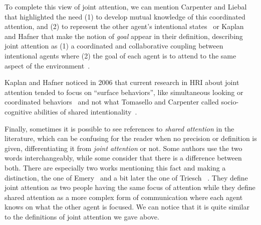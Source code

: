 \documentclass[a4paper,11pt,twoside]{StyleThese}
\begin{document}
To complete this view of joint attention, we can mention Carpenter and Liebal that highlighted the need (1) to develop mutual knowledge of this coordinated attention, and (2) to represent the other agent’s intentional states~\cite{carpenter_2011_joint} or Kaplan and Hafner that make the notion of \emph{goal} appear in their definition, describing joint attention as (1) a coordinated and collaborative coupling between intentional agents where (2) the goal of each agent is to attend to the same aspect of the environment~\cite{kaplan_2006_challenges}.

Kaplan and Hafner noticed in 2006 that current research in HRI about joint attention tended to focus on ``surface behaviors'', like simultaneous looking or coordinated behaviors~\cite{kaplan_2006_challenges} and not what Tomasello and Carpenter called socio-cognitive abilities of shared intentionality~\cite{tomasello_2007_shared}.

Finally, sometimes it is possible to see references to \emph{shared attention} in the literature, which can be confusing for the reader when no precision or definition is given, differentiating it from \emph{joint attention} or not. Some authors use the two words interchangeably, while some consider that there is a difference between both. There are especially two works mentioning this fact and making a distinction, the one of Emery~\cite{emery_2000_eyes} and a bit later the one of Triesch \etal~\cite{triesch_2006_gaze}. They define joint attention as two people having the same focus of attention while they define shared attention as a more complex form of communication where each agent knows on what the other agent is focused. We can notice that it is quite similar to the definitions of joint attention we gave above.
\end{document}
